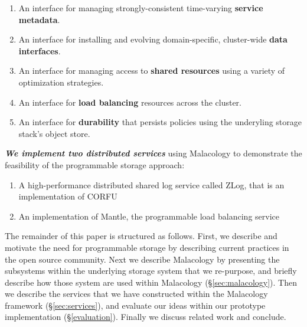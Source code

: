 \documentclass[preprint]{sigplanconf-eurosys}
\begin{document}
\begin{enumerate}

\item An interface for managing strongly-consistent time-varying \textbf{service
metadata}.

\item An interface for installing and evolving domain-specific, cluster-wide
\textbf{data interfaces}.

\item An interface for managing access to \textbf{shared resources} using a
variety of optimization strategies.

\item An interface for \textbf{load balancing} resources across the cluster.

\item An interface for \textbf{durability} that persists policies using the
underyling storage stack's object store.

\end{enumerate}

{\it \textbf{We implement two distributed services}} using 
Malacology to demonstrate the feasibility of the programmable storage approach:

\begin{enumerate}

\item A high-performance distributed shared log service called ZLog, that is an
implementation of CORFU~\cite{balakrishnan_corfu_2012}

\item An implementation of Mantle, the programmable load balancing
service~\cite{sevilla:sc15-mantle}

\end{enumerate}

The remainder of this paper is structured as follows. First, we describe and
motivate the need for programmable storage by describing current practices in
the open source community. Next we describe Malacology by presenting the
subsystems within the underlying storage system that we re-purpose, and briefly
describe how those system are used within Malacology (\S\ref{sec:malacology}).
Then we describe the services that we have constructed within the Malacology
framework (\S\ref{sec:services}), and evaluate our ideas within our prototype
implementation (\S\ref{evaluation}).  Finally we discuss related work and
conclude.
\end{document}
